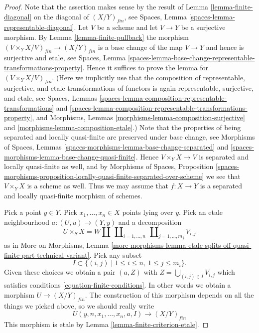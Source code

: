 \begin{proof}
Note that the assertion makes sense by the result of
Lemma \ref{lemma-finite-diagonal}
on the diagonal of $(X/Y)_{fin}$, see
Spaces, Lemma \ref{spaces-lemma-representable-diagonal}.
Let $V$ be a scheme and let $V \to Y$ be a surjective morphism. By
Lemma \ref{lemma-finite-pullback}
the morphism $(V \times_Y X/V)_{fin} \to (X/Y)_{fin}$ is
a base change of the map $V \to Y$ and hence is surjective and etale, see
Spaces,
Lemma \ref{spaces-lemma-base-change-representable-transformations-property}.
Hence it suffices to prove the lemma for $(V \times_Y X/V)_{fin}$.
(Here we implicitly use that the composition of representable, surjective, and
etale transformations of functors is again representable, surjective, and
etale, see
Spaces, Lemmas \ref{spaces-lemma-composition-representable-transformations} and
\ref{spaces-lemma-composition-representable-transformations-property}, and
Morphisms, Lemmas \ref{morphisms-lemma-composition-surjective} and
\ref{morphisms-lemma-composition-etale}.)
Note that the properties of being separated and locally quasi-finite
are preserved under base change, see
Morphisms of Spaces,
Lemmas \ref{spaces-morphisms-lemma-base-change-separated} and
\ref{spaces-morphisms-lemma-base-change-quasi-finite}.
Hence $V \times_Y X \to V$ is separated and locally quasi-finite as well,
and by
Morphisms of Spaces, Proposition
\ref{spaces-morphisms-proposition-locally-quasi-finite-separated-over-scheme}
we see that $V \times_Y X$ is a scheme as well.
Thus we may assume that $f : X \to Y$ is a separated and locally quasi-finite
morphism of schemes.

\medskip\noindent
Pick a point $y \in Y$. Pick $x_1, \ldots, x_n \in X$ points
lying over $y$. Pick an etale neighbourhood $a : (U, u) \to (Y, y)$ and a
decomposition
$$
U \times_S X =
W \coprod
\ \coprod\nolimits_{i = 1, \ldots, n}
\ \coprod\nolimits_{j = 1, \ldots, m_j}
V_{i, j}
$$
as in
More on Morphisms, Lemma
\ref{more-morphisms-lemma-etale-splits-off-quasi-finite-part-technical-variant}.
Pick any subset
$$
I \subset \{(i, j) \mid 1 \leq i \leq n,\ 1 \leq j \leq m_i\}.
$$
Given these choices we obtain a pair $(a, Z)$ with
$Z = \bigcup_{(i, j) \in I} V_{i, j}$
which satisfies conditions \ref{equation-finite-conditions}. In other words
we obtain a morphism $U \to (X/Y)_{fin}$. The construction of this morphism
depends on all the things we picked above, so we should really write
$$
U(y, n, x_1, \ldots, x_n, a, I) \longrightarrow (X/Y)_{fin}
$$
This morphism is etale by Lemma \ref{lemma-finite-criterion-etale}.


\end{proof}
